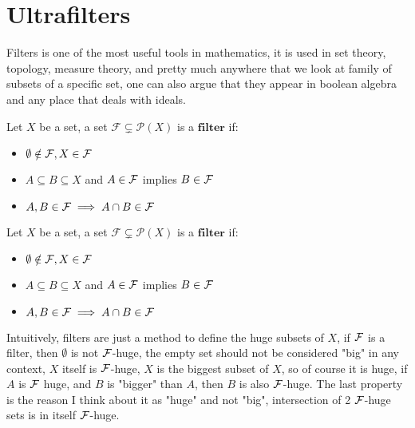 	\section[Ultrafilters]{Ultrafilters}
	\begin{frame}
		Filters is one of the most useful tools in mathematics, it is used in set theory, topology, measure theory, and pretty much anywhere that we look at family of subsets of a specific set, one can also argue that they appear in boolean algebra and any place that deals with ideals.
		\begin{definition}[filter]
			Let $X$ be a set, a set $\mathcal{F}\subsetneq\mathcal{P}(X)$ is a $\mathbf{filter}$ if:
			\begin{itemize}
				\item $\emptyset\notin \mathcal{F}, X\in\mathcal{F}$
				\item $A\subseteq B\subseteq X$ and $A\in\mathcal{F}$
				implies $B\in\mathcal{F}$
				\item $A,B\in\mathcal{F}\implies A\cap B\in\mathcal{F}$
			\end{itemize}
		\end{definition}
	\end{frame}
	\begin{frame}
		\begin{definition}[filter]
			Let $X$ be a set, a set $\mathcal{F}\subsetneq\mathcal{P}(X)$ is a $\mathbf{filter}$ if:
			\begin{itemize}
				\item $\emptyset\notin \mathcal{F}, X\in\mathcal{F}$
				\item $A\subseteq B\subseteq X$ and $A\in\mathcal{F}$
				implies $B\in\mathcal{F}$
				\item $A,B\in\mathcal{F}\implies A\cap B\in\mathcal{F}$
			\end{itemize}
		\end{definition}
		Intuitively, filters are just a method to define the huge subsets of $X$\pause, if $\mathcal{F}$ is a filter, then $\emptyset$ is not $\mathcal{F}$-huge, the empty set should not be considered "big" in any context\pause, $X$ itself is $\mathcal{F}$-huge, $X$ is the biggest subset of $X$, so of course it is huge\pause, if $A$ is $\mathcal{F}$ huge, and $B$ is "bigger" than $A$, then $B$ is also $\mathcal{F}$-huge.\pause\newline
		The last property is the reason I think about it as "huge" and not "big", intersection of 2 $\mathcal{F}$-huge sets is in itself $\mathcal{F}$-huge.
	\end{frame}
